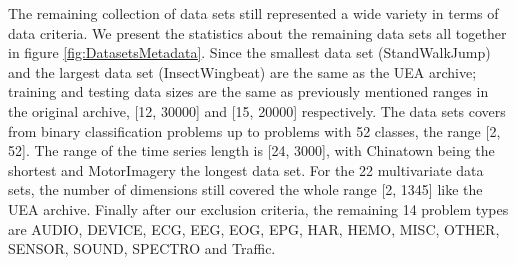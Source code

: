 The remaining collection of data sets still represented a wide variety in terms of data criteria.
We present the statistics about the remaining data sets all together in figure \ref{fig:DatasetsMetadata}.
Since the smallest data set (StandWalkJump) and the largest data set (InsectWingbeat) are the same as the UEA archive; training and testing data sizes are the same as previously mentioned ranges in the original archive, [12, 30000] and [15, 20000] respectively.
The data sets covers from binary classification problems up to problems with 52 classes, the range [2, 52].
The range of the time series length is [24, 3000], with Chinatown being the shortest and MotorImagery the longest data set.
For the 22 multivariate data sets, the number of dimensions still covered the whole range [2, 1345] like the UEA archive.
Finally after our exclusion criteria, the remaining 14 problem types are AUDIO, DEVICE, ECG, EEG, EOG, EPG, HAR, HEMO, MISC, OTHER, SENSOR, SOUND, SPECTRO and Traffic.

